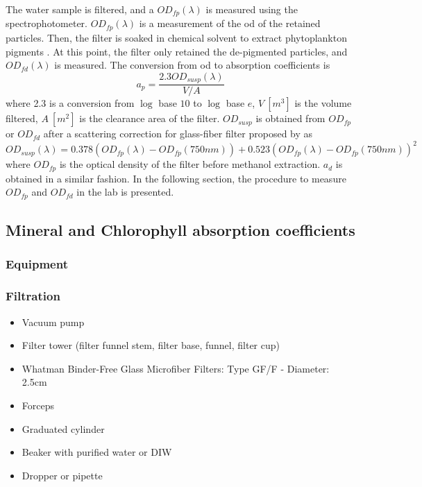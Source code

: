 \begin{appendices}
The water sample is filtered, and a $OD_{fp}(\lambda)$ is measured using the spectrophotometer. $OD_{fp}(\lambda)$ is a measurement of the \gls{od} of the retained particles. Then, the filter is soaked in chemical solvent to extract phytoplankton pigments \citep{Kishino1985cj}. At this point, the filter only retained the de-pigmented particles, and $OD_{fd}(\lambda)$ is measured. The conversion from \gls{od} to absorption coefficients is \citep{Cleveland1993}
\begin{equation}
  a_p = \frac{\displaystyle 2.3 OD_{susp}(\lambda)}{V/A}
\end{equation}
\noindent where 2.3 is a conversion from $\log$ base $10$ to $\log$ base $e$, $V~[m^3]$ is the volume filtered, $A~[m^2]$ is the clearance area of the filter. $OD_{susp}$ is obtained from $OD_{fp}$ or $OD_{fd}$ after a scattering correction for glass-fiber filter proposed by \citet{Cleveland1993} as
\begin{equation}
   OD_{susp}(\lambda) = 0.378 (OD_{fp}(\lambda)-OD_{fp}(750nm)) + 0.523 (OD_{fp}(\lambda)-OD_{fp}(750nm))^2
 \end{equation} 
 \noindent where $OD_{fp}$ is the optical density of the filter before methanol extraction. $a_d$ is obtained in a similar fashion. In the following section, the procedure to measure $OD_{fp}$ and $OD_{fd}$ in the lab is presented.


\subsection{Mineral and Chlorophyll absorption coefficients}


\subsubsection{Equipment}
\subsubsection*{Filtration}
\begin{itemize}[itemsep=2pt,parsep=2pt]
  \item Vacuum pump
  \item Filter tower (filter funnel stem, filter base, funnel, filter cup)
  \item Whatman Binder-Free Glass Microfiber Filters: Type GF/F - Diameter: 2.5cm
  \item Forceps
  \item Graduated cylinder
  \item Beaker with purified water or DIW
  \item Dropper or pipette
\end{itemize}

\end{appendices}

